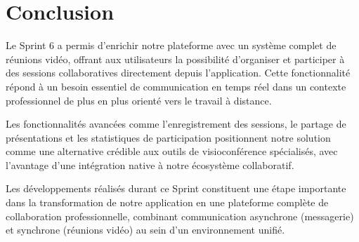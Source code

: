       \newpage


\section*{Conclusion}
Le Sprint 6 a permis d'enrichir notre plateforme avec un système complet de réunions vidéo, offrant aux utilisateurs la possibilité d'organiser et participer à des sessions collaboratives directement depuis l'application. Cette fonctionnalité répond à un besoin essentiel de communication en temps réel dans un contexte professionnel de plus en plus orienté vers le travail à distance.

Les fonctionnalités avancées comme l'enregistrement des sessions, le partage de présentations et les statistiques de participation positionnent notre solution comme une alternative crédible aux outils de visioconférence spécialisés, avec l'avantage d'une intégration native à notre écosystème collaboratif.

Les développements réalisés durant ce Sprint constituent une étape importante dans la transformation de notre application en une plateforme complète de collaboration professionnelle, combinant communication asynchrone (messagerie) et synchrone (réunions vidéo) au sein d'un environnement unifié. 
